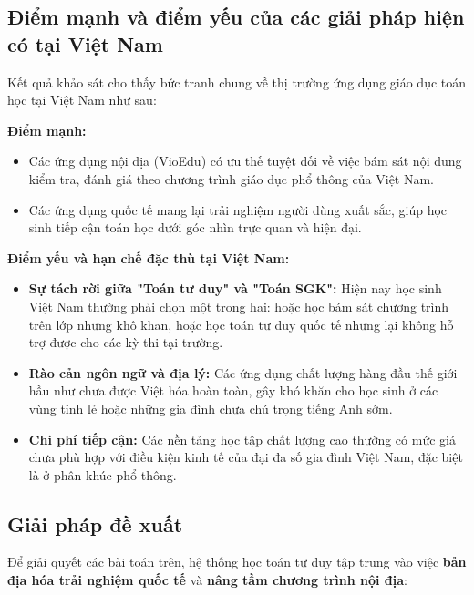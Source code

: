 \subsection{Điểm mạnh và điểm yếu của các giải pháp hiện có tại Việt Nam}

Kết quả khảo sát cho thấy bức tranh chung về thị trường ứng dụng giáo dục toán học tại Việt Nam như sau:

\textbf{Điểm mạnh:}
\begin{itemize}
	\item Các ứng dụng nội địa (VioEdu) có ưu thế tuyệt đối về việc bám sát nội dung kiểm tra, đánh giá theo chương trình giáo dục phổ thông của Việt Nam.
	\item Các ứng dụng quốc tế mang lại trải nghiệm người dùng xuất sắc, giúp học sinh tiếp cận toán học dưới góc nhìn trực quan và hiện đại.
\end{itemize}

\textbf{Điểm yếu và hạn chế đặc thù tại Việt Nam:}
\begin{itemize}
	\item \textbf{Sự tách rời giữa "Toán tư duy" và "Toán SGK":} Hiện nay học sinh Việt Nam thường phải chọn một trong hai: hoặc học bám sát chương trình trên lớp nhưng khô khan, hoặc học toán tư duy quốc tế nhưng lại không hỗ trợ được cho các kỳ thi tại trường.
	\item \textbf{Rào cản ngôn ngữ và địa lý:} Các ứng dụng chất lượng hàng đầu thế giới hầu như chưa được Việt hóa hoàn toàn, gây khó khăn cho học sinh ở các vùng tỉnh lẻ hoặc những gia đình chưa chú trọng tiếng Anh sớm.
	\item \textbf{Chi phí tiếp cận:} Các nền tảng học tập chất lượng cao thường có mức giá chưa phù hợp với điều kiện kinh tế của đại đa số gia đình Việt Nam, đặc biệt là ở phân khúc phổ thông.
\end{itemize}

\subsection{Giải pháp đề xuất}

Để giải quyết các bài toán trên, hệ thống học toán tư duy tập trung vào việc \textbf{bản địa hóa trải nghiệm quốc tế} và \textbf{nâng tầm chương trình nội địa}:

